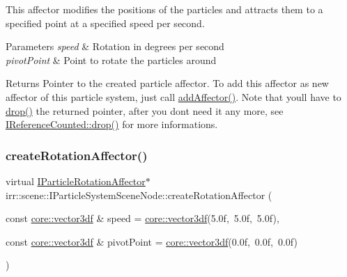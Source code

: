 This affector modifies the positions of the particles and attracts them to a specified point at a specified speed per second. 
\begin{DoxyParams}{Parameters}
{\em speed} & Rotation in degrees per second \\
\hline
{\em pivot\+Point} & Point to rotate the particles around \\
\hline
\end{DoxyParams}
\begin{DoxyReturn}{Returns}
Pointer to the created particle affector. To add this affector as new affector of this particle system, just call \hyperlink{classirr_1_1scene_1_1IParticleSystemSceneNode_a401f5afbbb748878011c5ceb7d447f8b}{add\+Affector()}. Note that you\textquotesingle{}ll have to \hyperlink{classirr_1_1IReferenceCounted_a03856a09355b89d178090c4a5f738543}{drop()} the returned pointer, after you don\textquotesingle{}t need it any more, see \hyperlink{classirr_1_1IReferenceCounted_a03856a09355b89d178090c4a5f738543}{I\+Reference\+Counted\+::drop()} for more informations. 
\end{DoxyReturn}
\mbox{\label{classirr_1_1scene_1_1IParticleSystemSceneNode_a7a09b7ebc0d4a2d164233c42689623d6}} 
\subsubsection{\texorpdfstring{create\+Rotation\+Affector()}{createRotationAffector()}\hspace{0.1cm}{\footnotesize\ttfamily [2/2]}}
{\footnotesize\ttfamily virtual \hyperlink{classirr_1_1scene_1_1IParticleRotationAffector}{I\+Particle\+Rotation\+Affector}$\ast$ irr\+::scene\+::\+I\+Particle\+System\+Scene\+Node\+::create\+Rotation\+Affector (\begin{DoxyParamCaption}\item[{const \hyperlink{namespaceirr_1_1core_ae6e2b2a6c552833ebbd5b7463d03586b}{core\+::vector3df} \&}]{speed = {\ttfamily \hyperlink{namespaceirr_1_1core_ae6e2b2a6c552833ebbd5b7463d03586b}{core\+::vector3df}(5.0f,~5.0f,~5.0f)},  }\item[{const \hyperlink{namespaceirr_1_1core_ae6e2b2a6c552833ebbd5b7463d03586b}{core\+::vector3df} \&}]{pivot\+Point = {\ttfamily \hyperlink{namespaceirr_1_1core_ae6e2b2a6c552833ebbd5b7463d03586b}{core\+::vector3df}(0.0f,~0.0f,~0.0f)} }\end{DoxyParamCaption})\hspace{0.3cm}{\ttfamily [pure virtual]}}




